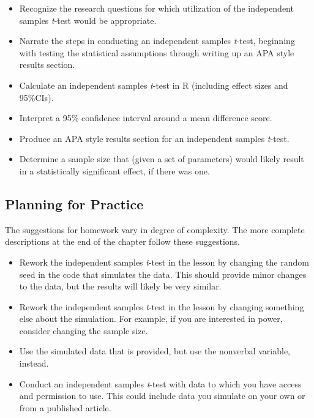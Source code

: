 \documentclass[
  11pt,
]{book}
\providecommand{\tightlist}{%
  \setlength{\itemsep}{0pt}\setlength{\parskip}{0pt}}
\begin{document}
\begin{itemize}
\tightlist
\item
  Recognize the research questions for which utilization of the independent samples \emph{t}-test would be appropriate.
\item
  Narrate the steps in conducting an independent samples \emph{t}-test, beginning with testing the statistical assumptions through writing up an APA style results section.
\item
  Calculate an independent samples \emph{t}-test in R (including effect sizes and 95\%CIs).
\item
  Interpret a 95\% confidence interval around a mean difference score.
\item
  Produce an APA style results section for an independent samples \emph{t}-test.
\item
  Determine a sample size that (given a set of parameters) would likely result in a statistically significant effect, if there was one.
\end{itemize}

\hypertarget{planning-for-practice-2}{%
\subsection{Planning for Practice}\label{planning-for-practice-2}}

The suggestions for homework vary in degree of complexity. The more complete descriptions at the end of the chapter follow these suggestions.

\begin{itemize}
\tightlist
\item
  Rework the independent samples \emph{t}-test in the lesson by changing the random seed in the code that simulates the data. This should provide minor changes to the data, but the results will likely be very similar.
\item
  Rework the independent samples \emph{t}-test in the lesson by changing something else about the simulation. For example, if you are interested in power, consider changing the sample size.
\item
  Use the simulated data that is provided, but use the nonverbal variable, instead.
\item
  Conduct an independent samples \emph{t}-test with data to which you have access and permission to use. This could include data you simulate on your own or from a published article.
\end{itemize}
\end{document}
